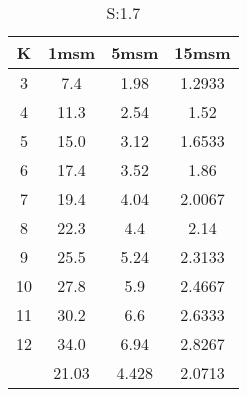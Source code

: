 \begin{table}[H]
\centering
\begin{tabular}{c|ccc}
K &1msm &5msm &15msm\\
\hline
3 & 7.4 & 1.98 & 1.2933\\
4 & 11.3 & 2.54 & 1.52\\
5 & 15.0 & 3.12 & 1.6533\\
6 & 17.4 & 3.52 & 1.86\\
7 & 19.4 & 4.04 & 2.0067\\
8 & 22.3 & 4.4 & 2.14\\
9 & 25.5 & 5.24 & 2.3133\\
10 & 27.8 & 5.9 & 2.4667\\
11 & 30.2 & 6.6 & 2.6333\\
12 & 34.0 & 6.94 & 2.8267\\
\hline
& 21.03 & 4.428 & 2.0713\\
\end{tabular}
\caption{S:1.7}
\label{tab:s1.7}
\end{table}
